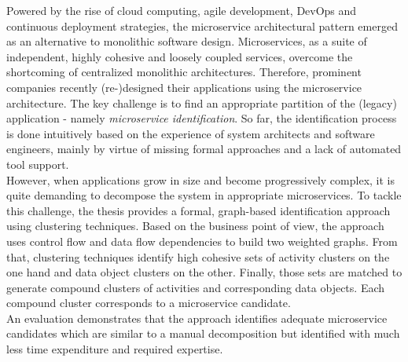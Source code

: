 

\Abstract
Powered by the rise of cloud computing, agile development, DevOps and continuous deployment strategies, the microservice architectural pattern emerged as an alternative to monolithic software design. Microservices, as a suite of independent, highly cohesive and loosely coupled services, overcome the shortcoming of centralized monolithic architectures. Therefore, prominent companies recently (re-)designed their applications using the microservice architecture.
The key challenge is to find an appropriate partition of the (legacy) application - namely \textit{microservice identification}. 
So far, the identification process is done intuitively based on the experience of system architects and software engineers, mainly by virtue of missing formal approaches and a lack of automated tool support. \\
However, when applications grow in size and become progressively complex, it is quite demanding to decompose the system in appropriate microservices.
To tackle this challenge, the thesis provides a formal, graph-based identification approach using clustering techniques. Based on the business point of view, the approach uses control flow and data flow dependencies to build two weighted graphs. From that, clustering techniques identify high cohesive sets of activity clusters on the one hand and data object clusters on the other.
Finally, those sets are matched to generate compound clusters of activities and corresponding data objects. Each compound cluster corresponds to a microservice candidate. \\
An evaluation demonstrates that the approach identifies adequate microservice candidates which are similar to a manual decomposition but identified with much less time expenditure and required expertise.


